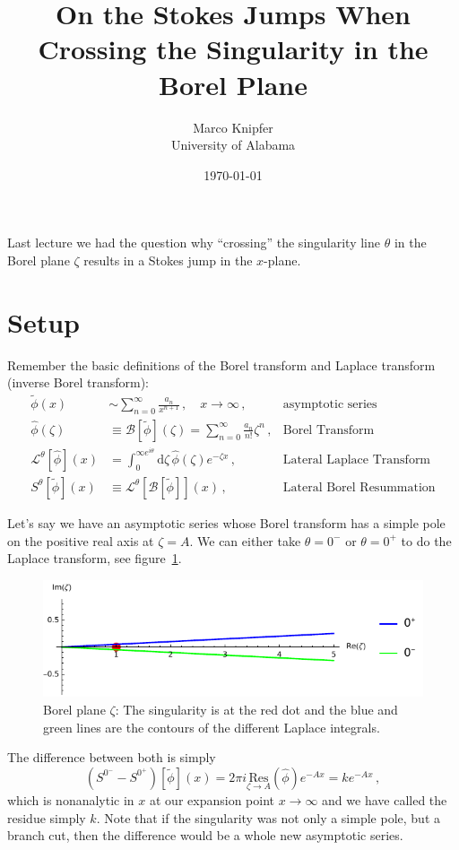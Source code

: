 \documentclass[11pt,a4paper]{scrartcl}
\title{On the Stokes Jumps When Crossing the Singularity in the Borel Plane}
\date{\today}
\author{Marco Knipfer \\ University of Alabama}
\newcommand{\diff}{\mathrm{d}}
\begin{document}
\maketitle
Last lecture we had the question why ``crossing'' the singularity line $\theta$ in the Borel plane $\zeta$
results in a Stokes jump in the $x$-plane.

\section{Setup}
Remember the basic definitions of the Borel transform and Laplace transform (inverse Borel transform):
\begin{align}
	\tilde{\phi}(x) &\sim \sum_{n=0}^\infty \frac{a_n}{x^{n+1}}\,, \quad x\to \infty \,,&\text{asymptotic series} \\
	\hat{\phi}(\zeta) &\equiv \mathcal{B}[\tilde{\phi}](\zeta) = \sum_{n=0}^\infty \frac{a_n}{n!} \zeta^n\,,
			  &\text{Borel Transform}\\
	\mathcal{L}^\theta [\hat{\phi}](x) &= \int_0^{\infty e^{i \theta}}\diff\zeta\, \hat{\phi}(\zeta) e^{- \zeta x}\,,
					       &\text{Lateral Laplace Transform}\\
	S^\theta[\tilde{\phi}](x) &\equiv \mathcal{L}^\theta[\mathcal{B}[\tilde{\phi}]](x)\,, &\text{Lateral Borel Resummation}
\end{align}

Let's say we have an asymptotic series whose Borel transform has a simple pole on the positive real axis at $\zeta = A$.
We can either take $\theta = 0^-$ or $\theta = 0^+$ to do the Laplace transform, see figure~\ref{fig:laplaceContours}.
\begin{figure}
	\centering
	  \includegraphics[width=0.8\linewidth]{laplace.pdf}
	  \caption{Borel plane $\zeta$: The singularity is at the red dot and the
	  	blue and green lines are the contours of the different Laplace integrals. }
	  \label{fig:laplaceContours}
\end{figure}
The difference between both is simply
\begin{equation}
	\left( S^{0^-} - S^{0^+} \right)[\tilde{\phi}](x) = 2 \pi i \underset{\zeta\to A}{\mathrm{Res}}(\hat\phi) e^{- A x}
	= k e^{-Ax}\,,
	\label{eq:ambiguity}
\end{equation}
which is nonanalytic in $x$ at our expansion point $x\to\infty$ and we have called the residue simply $k$.
Note that if the singularity was not only a simple pole, but a branch cut, then the difference would be a
whole new asymptotic series.
\end{document}
